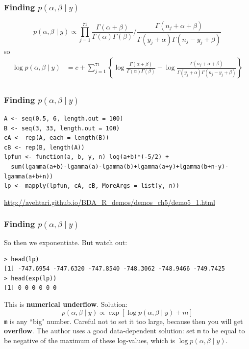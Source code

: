 \documentclass{beamer}
\begin{document}
\begin{frame}
\frametitle{Finding $p(\alpha,\beta \mid y)$ }

\[
p(\alpha, \beta \mid y) \propto \prod_{j=1}^{71} \frac{\Gamma(\alpha + \beta )}{ \Gamma(\alpha)\Gamma( \beta) } \bigg/ \frac{\Gamma(n_j + \alpha + \beta )}{ \Gamma(y_j+\alpha)\Gamma(n_j - y_j + \beta) }
\]
so
\begin{align*}
\log p(\alpha, \beta \mid y) &= c +  \sum_{j=1}^{71} \left\{ \log  \frac{\Gamma(\alpha + \beta )}{ \Gamma(\alpha)\Gamma( \beta) } - \log \frac{\Gamma(n_j + \alpha + \beta )}{ \Gamma(y_j+\alpha)\Gamma(n_j - y_j + \beta) } \right\}\\
\end{align*}
\end{frame}


\begin{frame}[fragile]
\frametitle{Finding $p(\alpha,\beta \mid y)$ }

\begin{verbatim}
A <- seq(0.5, 6, length.out = 100)
B <- seq(3, 33, length.out = 100)
cA <- rep(A, each = length(B))
cB <- rep(B, length(A))
lpfun <- function(a, b, y, n) log(a+b)*(-5/2) +
  sum(lgamma(a+b)-lgamma(a)-lgamma(b)+lgamma(a+y)+lgamma(b+n-y)-lgamma(a+b+n))
lp <- mapply(lpfun, cA, cB, MoreArgs = list(y, n))
\end{verbatim}


\url{http://avehtari.github.io/BDA_R_demos/demos_ch5/demo5_1.html}

\end{frame}


\begin{frame}[fragile]
\frametitle{Finding $p(\alpha,\beta \mid y)$ }

So then we exponentiate. But watch out: 
\begin{verbatim}
> head(lp)
[1] -747.6954 -747.6320 -747.8540 -748.3062 -748.9466 -749.7425
> head(exp(lp))
[1] 0 0 0 0 0 0
\end{verbatim}
\pause

This is {\bf numerical underflow}. Solution:
\[
p(\alpha, \beta \mid y) \propto \exp[\log p(\alpha, \beta \mid y) + m]
\]
\verb|m| is any ``big" number. Careful not to set it too large, because then you will get {\bf overflow}. The author uses a good data-dependent solution: set \verb|m| to be equal to be negative of the maximum of these log-values, which is $\log p(\alpha, \beta \mid y)$. 

\end{frame}
\end{document}
